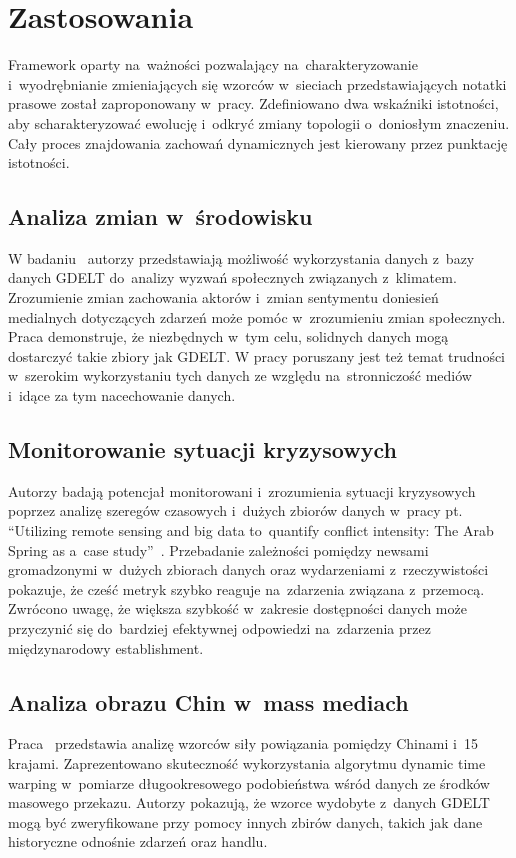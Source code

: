 \documentclass[11pt]{report}
\begin{document}
    \section{Zastosowania}\label{sec:zastosowania}
    Framework oparty na~ważności pozwalający na~charakteryzowanie
    i~wyodrębnianie zmieniających się wzorców w~sieciach przedstawiających notatki prasowe został zaproponowany
    w~pracy\cite{Yan2012}.
    Zdefiniowano dwa wskaźniki istotności, aby scharakteryzować ewolucję i~odkryć zmiany topologii o~doniosłym znaczeniu.
    Cały proces znajdowania zachowań dynamicznych jest kierowany przez punktację istotności.

    \subsection{Analiza zmian w~środowisku}
    W badaniu~\cite{Buckingham2020} autorzy przedstawiają możliwość wykorzystania danych z~bazy danych GDELT
    do~analizy wyzwań społecznych związanych z~klimatem.
    Zrozumienie zmian zachowania aktorów i~zmian sentymentu doniesień medialnych dotyczących zdarzeń może pomóc w~zrozumieniu zmian społecznych.
    Praca demonstruje, że niezbędnych w~tym celu, solidnych danych mogą dostarczyć takie zbiory jak GDELT\@.
    W pracy poruszany jest też temat trudności w~szerokim wykorzystaniu tych danych ze względu na~stronniczość mediów
    i~idące za tym nacechowanie danych.

    \subsection{Monitorowanie sytuacji kryzysowych}
    Autorzy badają potencjał monitorowani i~zrozumienia sytuacji kryzysowych poprzez analizę szeregów czasowych i~dużych zbiorów danych
    w~pracy pt. ``Utilizing remote sensing and big data to~quantify conflict intensity: The Arab Spring as a~case study''~\cite{Levin2018}.
    Przebadanie zależności pomiędzy newsami gromadzonymi w~dużych zbiorach danych oraz wydarzeniami z~rzeczywistości pokazuje,
    że cześć metryk szybko reaguje na~zdarzenia związana z~przemocą.
    Zwrócono uwagę, że większa szybkość w~zakresie dostępności danych może przyczynić się do~bardziej efektywnej
    odpowiedzi na~zdarzenia przez międzynarodowy establishment.

    \subsection{Analiza obrazu Chin w~mass mediach}
    Praca~\cite{Yuan2017} przedstawia analizę wzorców siły powiązania pomiędzy Chinami i~15 krajami.
    Zaprezentowano skuteczność wykorzystania algorytmu dynamic time warping w~pomiarze długookresowego podobieństwa
    wśród danych ze środków masowego przekazu.
    Autorzy pokazują, że wzorce wydobyte z~danych GDELT mogą być zweryfikowane przy pomocy innych zbirów danych,
    takich jak dane historyczne odnośnie zdarzeń oraz handlu.
\end{document}
